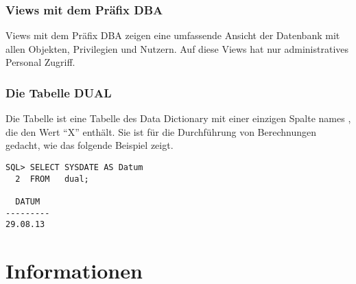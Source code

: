         \subsubsection{Views mit dem Präfix DBA}
          Views mit dem Präfix DBA zeigen eine umfassende Ansicht der Datenbank mit allen Objekten, Privilegien und Nutzern. Auf diese Views hat nur administratives Personal Zugriff.
        \subsubsection{Die Tabelle DUAL}
          Die Tabelle  ist eine Tabelle des Data Dictionary mit einer einzigen Spalte names , die den Wert \enquote{X} enthält. Sie ist für die Durchführung von Berechnungen gedacht, wie das folgende Beispiel zeigt.
        \begin{lstlisting}[caption={Die Tabelle DUAL},label=admin53,language=oracle_sql]
SQL> SELECT SYSDATE AS Datum
  2  FROM   dual;

  DATUM
---------
29.08.13
        \end{lstlisting}

        \begin{literaturinternet}
          \item \cite{i125539}
          \item \cite{i2112}
        \end{literaturinternet}
\clearpage
    \section{Informationen}
